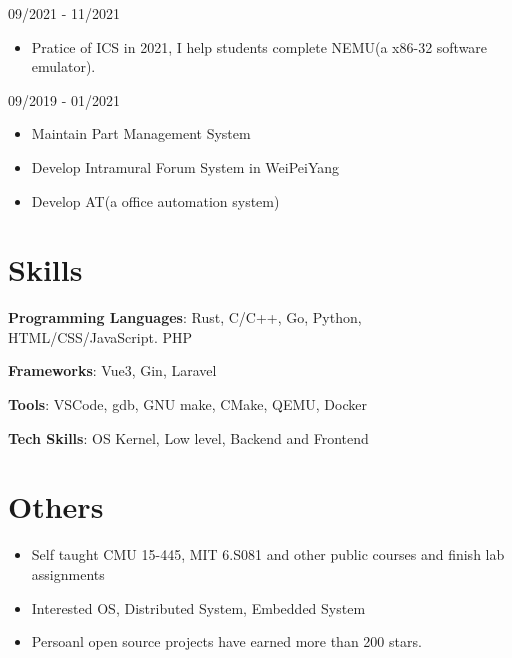 \documentclass{chicv}
\begin{document}
{09/2021 - 11/2021}
\begin{itemize}
  \item Pratice of ICS in 2021, I help students complete NEMU(a x86-32 software emulator).
\end{itemize}

{09/2019 - 01/2021}
\begin{itemize}
  \item Maintain Part Management System 
  \item Develop Intramural Forum System in WeiPeiYang
  \item Develop AT(a office automation system)
\end{itemize}



\section{Skills}

\begin{compactlist}
  \item \textbf{Programming Languages}: Rust, C/C++, Go, Python, HTML/CSS/JavaScript. PHP
  \item \textbf{Frameworks}: Vue3, Gin, Laravel
  \item \textbf{Tools}: VSCode, gdb, GNU make, CMake, QEMU, Docker
  \item \textbf{Tech Skills}: OS Kernel, Low level, Backend and Frontend
\end{compactlist}

\section{Others}
\begin{itemize}
  \item Self taught CMU 15-445, MIT 6.S081 and other public courses and finish lab assignments 
  \item Interested OS, Distributed System, Embedded System 
  \item Persoanl open source projects have earned more than 200 stars.
\end{itemize}
\end{document}
